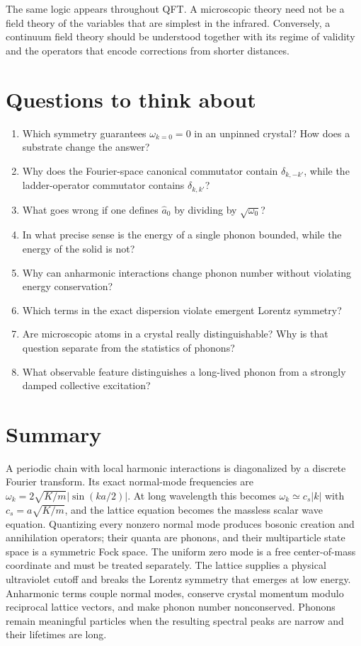 \documentclass[11pt]{article}
\begin{document}
The same logic appears throughout QFT.  A microscopic theory need not be a
field theory of the variables that are simplest in the infrared.  Conversely,
a continuum field theory should be understood together with its regime of
validity and the operators that encode corrections from shorter distances.

\section{Questions to think about}

\begin{enumerate}
  \item Which symmetry guarantees $\omega_{k=0}=0$ in an unpinned crystal?
  How does a substrate change the answer?
  \item Why does the Fourier-space canonical commutator contain
  $\delta_{k,-k'}$, while the ladder-operator commutator contains
  $\delta_{k,k'}$?
  \item What goes wrong if one defines $\hat a_0$ by dividing by
  $\sqrt{\omega_0}$?
  \item In what precise sense is the energy of a single phonon bounded, while
  the energy of the solid is not?
  \item Why can anharmonic interactions change phonon number without
  violating energy conservation?
  \item Which terms in the exact dispersion violate emergent Lorentz
  symmetry?
  \item Are microscopic atoms in a crystal really distinguishable?  Why is
  that question separate from the statistics of phonons?
  \item What observable feature distinguishes a long-lived phonon from a
  strongly damped collective excitation?
\end{enumerate}

\section*{Summary}

A periodic chain with local harmonic interactions is diagonalized by a
discrete Fourier transform.  Its exact normal-mode frequencies are
$\omega_k=2\sqrt{K/m}|\sin(ka/2)|$.  At long wavelength this becomes
$\omega_k\simeq c_s|k|$ with $c_s=a\sqrt{K/m}$, and the lattice equation
becomes the massless scalar wave equation.  Quantizing every nonzero normal
mode produces bosonic creation and annihilation operators; their quanta are
phonons, and their multiparticle state space is a symmetric Fock space.  The
uniform zero mode is a free center-of-mass coordinate and must be treated
separately.  The lattice supplies a physical ultraviolet cutoff and breaks
the Lorentz symmetry that emerges at low energy.  Anharmonic terms couple
normal modes, conserve crystal momentum modulo reciprocal lattice vectors,
and make phonon number nonconserved.  Phonons remain meaningful particles
when the resulting spectral peaks are narrow and their lifetimes are long.
\end{document}
